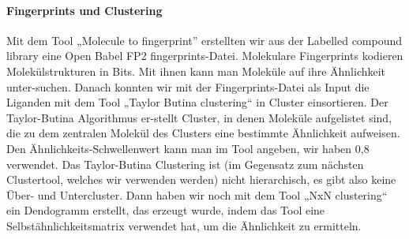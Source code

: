 \documentclass[11pt]{article}
\begin{document}
    \paragraph{Fingerprints und Clustering}
    Mit dem Tool „Molecule to fingerprint” erstellten wir aus der Labelled compound library eine Open Babel FP2 fingerprints-Datei. Molekulare Fingerprints kodieren Molekülstrukturen in Bits. Mit ihnen kann man Moleküle auf ihre Ähnlichkeit unter-suchen.
    Danach konnten wir mit der Fingerprints-Datei als Input die Liganden mit dem Tool „Taylor Butina clustering“ in Cluster einsortieren. Der Taylor-Butina Algorithmus er-stellt Cluster, in denen Moleküle aufgelistet sind, die zu dem zentralen Molekül des Clusters eine bestimmte Ähnlichkeit aufweisen. Den Ähnlichkeits-Schwellenwert kann man im Tool angeben, wir haben 0,8 verwendet. Das Taylor-Butina Clustering ist (im Gegensatz zum nächsten Clustertool, welches wir verwenden werden) nicht hierarchisch, es gibt also keine Über- und Untercluster.
    Dann haben wir noch mit dem Tool „NxN clustering“ ein Dendogramm erstellt, das erzeugt wurde, indem das Tool eine Selbstähnlichkeitsmatrix verwendet hat, um die Ähnlichkeit zu ermitteln.
\end{document}
